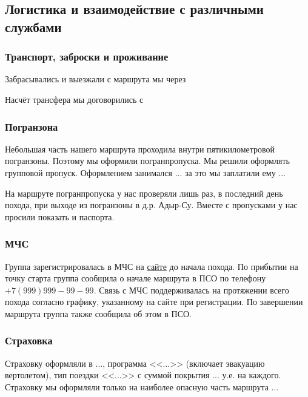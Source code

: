 	\subsection{Логистика и взаимодействие с различными службами}
		\subsubsection{Транспорт, заброски и проживание}

			Забрасывались и выезжали с маршрута мы через 
			
			Насчёт трансфера мы договорились с 

		\subsubsection{Погранзона}
			Небольшая часть нашего маршрута проходила внутри пятикилометровой погранзоны. Поэтому мы оформили
			погранпропуска. Мы решили оформлять групповой пропуск. Оформлением занимался ... за это мы
			заплатили ему ... 
			
			На маршруте погранпропуска у нас проверяли лишь раз, в последний день похода, при выходе из погранзоны
			в д.р. Адыр-Су. Вместе с пропусками у нас просили показать и паспорта. 


		\subsubsection{МЧС}
			Группа зарегистрировалась в МЧС на \href{https://forms.mchs.gov.ru/registration_tourist_groups}{сайте}
			до начала похода. По прибытии на точку старта группа сообщила о начале маршрута в ПСО по телефону
			$+7 (999) 999-99-99$. Связь с МЧС поддерживалась на протяжении всего похода согласно
			графику, указанному на сайте при регистрации. По завершении маршрута группа также сообщила об этом в ПСО.

		\subsubsection{Страховка}
			Страховку оформляли в ..., программа <<...>> (включает эвакуацию вертолетом), тип поездки
			<<...>> с суммой покрытия ... у.е. на каждого. Страховку мы оформляли только на наиболее
			опасную часть маршрута ...
 
